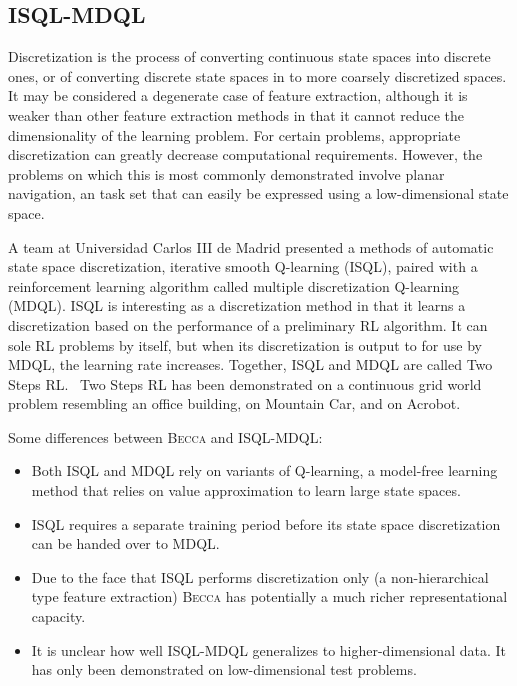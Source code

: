 \subsection{ISQL-MDQL} 
Discretization is the process of converting continuous state spaces into discrete ones, or of converting discrete state spaces in to more coarsely discretized spaces. It may be considered a degenerate case of feature extraction, although it is weaker than other feature extraction methods in that it cannot reduce the dimensionality of the learning problem. For certain problems, appropriate discretization can greatly decrease computational requirements. However, the problems on which this is most commonly demonstrated involve planar navigation, an task set that can easily be expressed using a low-dimensional state space.

A team at Universidad Carlos III de Madrid presented a methods of automatic state space discretization, iterative smooth Q-learning (ISQL), paired with a reinforcement learning algorithm called multiple discretization Q-learning (MDQL). ISQL is interesting as a discretization method in that it learns a discretization based on the performance of a preliminary RL algorithm. It can sole RL problems by itself, but when its discretization is output to for use by MDQL, the learning rate increases. Together, ISQL and MDQL are called Two Steps RL.~\cite{fernandez08} Two Steps RL has been demonstrated on a continuous grid world problem resembling an office building, on Mountain Car, and on Acrobot.

Some differences between \textsc{Becca} and ISQL-MDQL:

\begin{itemize}
\item Both ISQL and MDQL rely on variants of Q-learning, a model-free learning method that relies on value approximation to learn large state spaces.
\item ISQL requires a separate training period before its state space discretization can be handed over to MDQL.
\item Due to the face that ISQL performs discretization only (a non-hierarchical type feature extraction) \textsc{Becca} has potentially a much richer representational capacity.
\item It is unclear how well ISQL-MDQL generalizes to higher-dimensional data. It has only been demonstrated on low-dimensional test problems.
\end{itemize}


